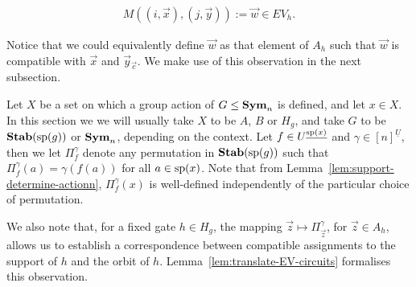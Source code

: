\documentclass[../paper.tex]{subfiles}
\begin{document}
\begin{align*}
	M((i , \vec{x}), (j, \vec{y})) := \vec{w} \in EV_h. 
\end{align*}

Notice that we could equivalently define $\vec{w}$ as that element of $A_h$ such
that $\vec{w}$ is compatible with $\vec{x}$ and $\vec{y}_{\vec{c}}$. We make use
of this observation in the next subsection.




Let $X$ be a set on which a group action of $G \leq \text{\textbf{Sym}}_n$ is defined, and let
$x \in X$. In this section we we will usually take $X$ to be $A$, $B$ or $H_g$,
and take $G$ to be $\text{\textbf{Stab}} (\text{sp} (g))$ or $\text{\textbf{Sym}}_n$, depending on the context. Let $f
\in U^{\underline{\text{sp}(x)}}$ and $\gamma \in [n]^{\underline{U}}$, then we let
$\Pi^{\gamma}_{f}$ denote any permutation in $\text{\textbf{Stab}} (\text{sp} (g))$ such that
$\Pi^{\gamma}_f (a) = \gamma (f(a))$ for all $a \in \text{sp}(x)$. Note that from
Lemma~\ref{lem:support-determine-actionn}, $\Pi^{\gamma}_f(x)$ is well-defined
independently of the particular choice of permutation.

We also note that, for a fixed gate $h \in H_g$, the mapping $\vec{z} \mapsto
\Pi^{\gamma}_{\vec{z}}$, for $\vec{z} \in A_h$, allows us to establish a
correspondence between compatible assignments to the support of $h$ and the
orbit of $h$. Lemma~\ref{lem:translate-EV-circuits} formalises this observation.
\end{document}
